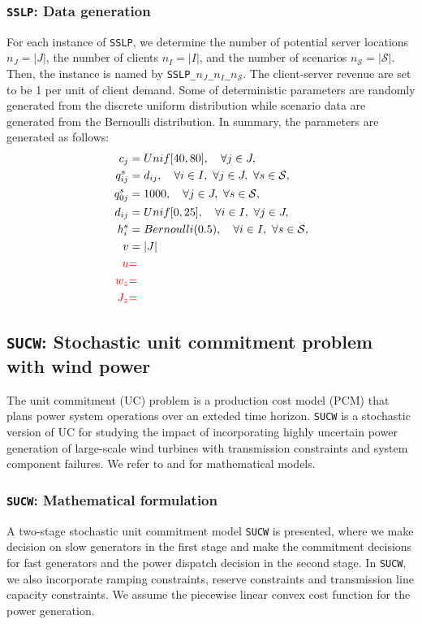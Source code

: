 \subsubsection{\texttt{SSLP}: Data generation}
For each instance of \texttt{SSLP}, we determine the number of potential server locations $n_J=|J|$, the number of clients $n_I=|I|$, and the number of scenarios $n_\mathcal{S}=|\mathcal{S}|$. Then, the instance is named by \texttt{SSLP\_$n_J$\_$n_I$\_$n_\mathcal{S}$}. The client-server revenue are set to be 1 per unit of client demand. Some of deterministic parameters are randomly generated from the discrete uniform distribution while scenario data are generated from the Bernoulli distribution. In summary, the parameters are generated as follows:
\begin{align*}
c_j	&=Unif[40,80],\quad\forall j\in J,\\
q_{ij}^s	&= d_{ij},\quad\forall i\in I,\ \forall j\in J,\ \forall s\in\mathcal{S},\\
q_{0j}^s	&=	1000,\quad\forall j\in J,\ \forall s\in\mathcal{S},\\
d_{ij}	&= Unif[0,25],\quad\forall i\in I,\ \forall j\in J,\\
h_i^s	&= Bernoulli(0.5),\quad\forall i\in I,\ \forall s\in \mathcal{S},\\
v 		&= |J|	\\
\textcolor{red}{u	}&\textcolor{red}{=		}\\
\textcolor{red}{w_z	}&\textcolor{red}{=		}\\
\textcolor{red}{J_z	}&\textcolor{red}{=	}
\end{align*}



\subsection{\texttt{SUCW}: Stochastic unit commitment problem with wind power} \label{SUCW}
The unit commitment (UC) problem is a production cost model (PCM) that plans power system operations over an exteded time horizon. \texttt{SUCW} is a stochastic version of UC for studying the impact of incorporating highly uncertain power generation of large-scale wind turbines with transmission constraints and system component failures. We refer to \cite{journal:PO2013} and \cite{journal:KZ2015} for mathematical models.
\subsubsection{\texttt{SUCW}: Mathematical formulation}
A two-stage stochastic unit commitment model \texttt{SUCW} is presented, where we make decision on slow generators in the first stage and make the commitment decisions for fast generators and the power dispatch decision in the second stage. In \texttt{SUCW}, we also incorporate ramping constraints, reserve constraints and transmission line capacity constraints. We assume the piecewise linear convex cost function for the power generation.

